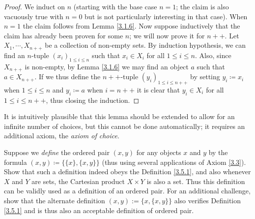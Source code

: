 \begin{proof}
We induct on \(n\) (starting with the base case \(n = 1\); the claim is also vacuously true with \(n = 0\) but is not particularly interesting in that case).
When \(n = 1\) the claim follows from Lemma \ref{3.1.6}.
Now suppose inductively that the claim has already been proven for some \(n\);
we will now prove it for \(n++\).
Let \(X_1, \cdots, X_{n++}\) be a collection of non-empty sets.
By induction hypothesis, we can find an \(n\)-tuple \((x_i)_{1 \leq i \leq n}\) such that \(x_i \in X_i\) for all \(1 \leq i \leq n\).
Also, since \(X_{n++}\) is non-empty, by Lemma \ref{3.1.6} we may find an object \(a\) such that \(a \in X_{n++}\).
If we thus define the \(n++\)-tuple \((y_i)_{1 \leq i \leq n++}\) by setting \(y_i \coloneqq x_i\) when \(1 \leq i \leq n\) and \(y_i \coloneqq a\) when \(i = n++\) it is clear that \(y_i \in X_i\) for all \(1 \leq i \leq n++\), thus closing the induction.
\end{proof}

\begin{remark}\label{3.5.13}
It is intuitively plausible that this lemma should be extended to allow for an infinite number of choices, but this cannot be done automatically;
it requires an additional axiom, the \emph{axiom of choice}.
\end{remark}

\exercisesection

\begin{exercise}\label{ex 3.5.1}
Suppose we \emph{define} the ordered pair \((x, y)\) for any objects \(x\) and \(y\) by the formula \((x, y) \coloneqq \{\{x\}, \{x, y\}\}\)
(thus using several applications of Axiom \ref{3.3}).
Show that such a definition indeed obeys the Definition \ref{3.5.1}, and also whenever \(X\) and \(Y\) are sets, the Cartesian product \(X \times Y\) is also a set.
Thus this definition can be validly used as a definition of an ordered pair.
For an additional challenge, show that the alternate definition \((x, y) := \{x, \{x, y\}\}\) also verifies Definition \ref{3.5.1} and is thus also an acceptable definition of ordered pair.
\end{exercise}

